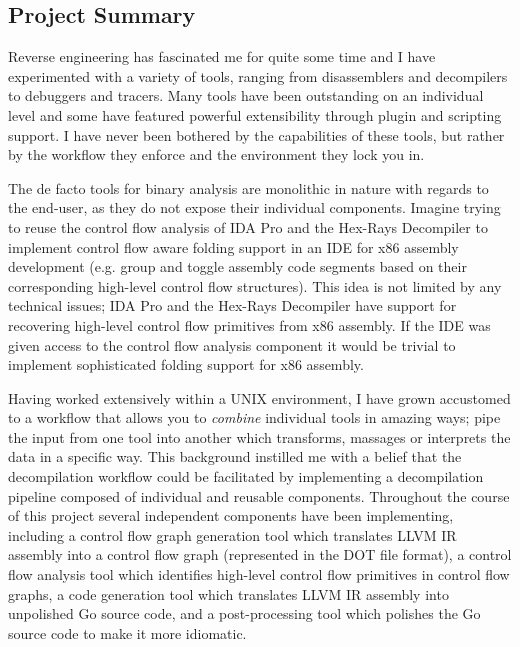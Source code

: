 
\subsection{Project Summary}


Reverse engineering has fascinated me for quite some time and I have experimented with a variety of tools, ranging from disassemblers and decompilers to debuggers and tracers. Many tools have been outstanding on an individual level and some have featured powerful extensibility through plugin and scripting support. I have never been bothered by the capabilities of these tools, but rather by the workflow they enforce and the environment they lock you in.

The de facto tools for binary analysis are monolithic in nature with regards to the end-user, as they do not expose their individual components. Imagine trying to reuse the control flow analysis of IDA Pro and the Hex-Rays Decompiler to implement control flow aware folding support in an IDE for x86 assembly development (e.g. group and toggle assembly code segments based on their corresponding high-level control flow structures). This idea is not limited by any technical issues; IDA Pro and the Hex-Rays Decompiler have support for recovering high-level control flow primitives from x86 assembly. If the IDE was given access to the control flow analysis component it would be trivial to implement sophisticated folding support for x86 assembly.

Having worked extensively within a UNIX environment, I have grown accustomed to a workflow that allows you to \textit{combine} individual tools in amazing ways; pipe the input from one tool into another which transforms, massages or interprets the data in a specific way. This background instilled me with a belief that the decompilation workflow could be facilitated by implementing a decompilation pipeline composed of individual and reusable components. Throughout the course of this project several independent components have been implementing, including a control flow graph generation tool which translates LLVM IR assembly into a control flow graph (represented in the DOT file format), a control flow analysis tool which identifies high-level control flow primitives in control flow graphs, a code generation tool which translates LLVM IR assembly into unpolished Go source code, and a post-processing tool which polishes the Go source code to make it more idiomatic.

